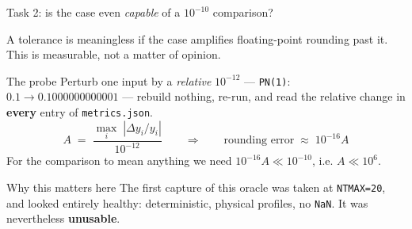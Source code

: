 \documentclass[10pt,aspectratio=169]{beamer}
\newcommand{\C}[1]{\texttt{\small #1}}          %
\begin{document}
\begin{frame}{Task 2: is the case even \emph{capable} of a $10^{-10}$ comparison?}

A tolerance is meaningless if the case amplifies floating-point rounding past it. This is measurable, not a
matter of opinion.

\vspace{0.5em}
\begin{block}{The probe}
Perturb one input by a \emph{relative} $10^{-12}$ --- \C{PN(1)}: $0.1 \to 0.1000000000001$ --- rebuild nothing,
re-run, and read the relative change in \textbf{every} entry of \C{metrics.json}.
\[
  A \;=\; \frac{\max_i \;|\Delta y_i / y_i|}{10^{-12}}
  \qquad\Longrightarrow\qquad
  \text{rounding error} \;\approx\; 10^{-16} A
\]
For the comparison to mean anything we need $10^{-16} A \ll 10^{-10}$, i.e. $A \ll 10^{6}$.
\end{block}

\vspace{0.3em}
\begin{exampleblock}{Why this matters here}
The first capture of this oracle was taken at \C{NTMAX=20}, and looked entirely healthy: deterministic,
physical profiles, no \C{NaN}. It was nevertheless \textbf{unusable}.
\end{exampleblock}
\end{frame}
\end{document}
